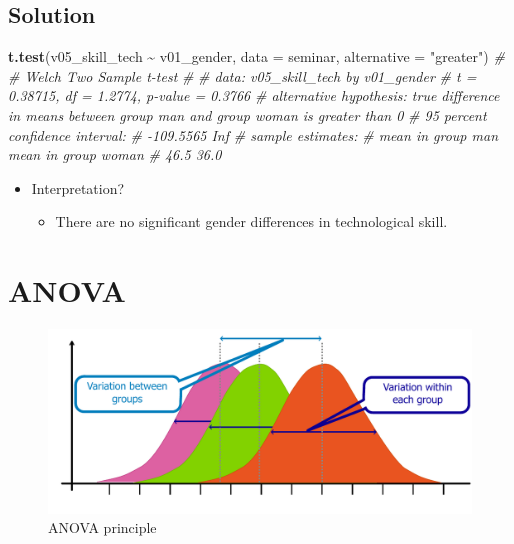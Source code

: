 \documentclass[
]{book}
\newenvironment{Shaded}{\begin{snugshade}}{\end{snugshade}}
\newcommand{\AttributeTok}[1]{\textcolor[rgb]{0.13,0.29,0.53}{#1}}
\newcommand{\CommentTok}[1]{\textcolor[rgb]{0.56,0.35,0.01}{\textit{#1}}}
\newcommand{\FunctionTok}[1]{\textcolor[rgb]{0.13,0.29,0.53}{\textbf{#1}}}
\newcommand{\NormalTok}[1]{#1}
\newcommand{\SpecialCharTok}[1]{\textcolor[rgb]{0.81,0.36,0.00}{\textbf{#1}}}
\newcommand{\StringTok}[1]{\textcolor[rgb]{0.31,0.60,0.02}{#1}}
\providecommand{\tightlist}{%
  \setlength{\itemsep}{0pt}\setlength{\parskip}{0pt}}
\begin{document}
\subsection{\texorpdfstring{Solution }{Solution }}\label{solution-3}

\begin{Shaded}
\begin{Highlighting}[]
\FunctionTok{t.test}\NormalTok{(v05\_skill\_tech }\SpecialCharTok{\textasciitilde{}}\NormalTok{ v01\_gender, }\AttributeTok{data =}\NormalTok{ seminar, }\AttributeTok{alternative =} \StringTok{"greater"}\NormalTok{)}
\CommentTok{\# }
\CommentTok{\#   Welch Two Sample t{-}test}
\CommentTok{\# }
\CommentTok{\# data:  v05\_skill\_tech by v01\_gender}
\CommentTok{\# t = 0.38715, df = 1.2774, p{-}value = 0.3766}
\CommentTok{\# alternative hypothesis: true difference in means between group man and group woman is greater than 0}
\CommentTok{\# 95 percent confidence interval:}
\CommentTok{\#  {-}109.5565       Inf}
\CommentTok{\# sample estimates:}
\CommentTok{\#   mean in group man mean in group woman }
\CommentTok{\#                46.5                36.0}
\end{Highlighting}
\end{Shaded}

\begin{itemize}
\tightlist
\item
  Interpretation?

  \begin{itemize}
  \tightlist
  \item
    There are no significant gender differences in technological skill.
  \end{itemize}
\end{itemize}

\section{ANOVA}\label{anova}

\begin{figure}
\centering
\includegraphics{./img/anova.pdf}
\caption{\label{fig:anovaprince}ANOVA principle}
\end{figure}
\end{document}
